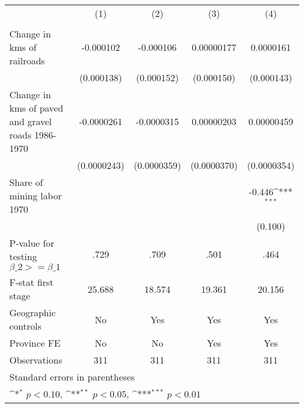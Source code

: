 {
\def\sym#1{\ifmmode^{#1}\else\(^{#1}\)\fi}
\begin{tabular}{l*{4}{c}}
\hline\hline
                &\multicolumn{1}{c}{(1)}&\multicolumn{1}{c}{(2)}&\multicolumn{1}{c}{(3)}&\multicolumn{1}{c}{(4)}\\
                &\multicolumn{1}{c}{}&\multicolumn{1}{c}{}&\multicolumn{1}{c}{}&\multicolumn{1}{c}{}\\
\hline
Change in kms of railroads&-0.000102         &-0.000106         &0.00000177         &0.0000161         \\
                &(0.000138)         &(0.000152)         &(0.000150)         &(0.000143)         \\
[1em]
Change in kms of paved and gravel roads 1986-1970&-0.0000261         &-0.0000315         &0.00000203         &0.00000459         \\
                &(0.0000243)         &(0.0000359)         &(0.0000370)         &(0.0000354)         \\
[1em]
Share of mining labor 1970&                  &                  &                  &   -0.446\sym{***}\\
                &                  &                  &                  &  (0.100)         \\
\hline
P-value for testing $\beta\_{2} >= \beta\_{1}$&     .729         &     .709         &     .501         &     .464         \\
F-stat first stage&   25.688         &   18.574         &   19.361         &   20.156         \\
Geographic controls&       No         &      Yes         &      Yes         &      Yes         \\
Province FE     &       No         &       No         &      Yes         &      Yes         \\
Observations    &      311         &      311         &      311         &      311         \\
\hline\hline
\multicolumn{5}{l}{\footnotesize Standard errors in parentheses}\\
\multicolumn{5}{l}{\footnotesize \sym{*} \(p<0.10\), \sym{**} \(p<0.05\), \sym{***} \(p<0.01\)}\\
\end{tabular}
}
